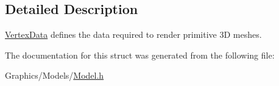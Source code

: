 \subsection{Detailed Description}
\hyperlink{structVertexData}{Vertex\+Data} defines the data required to render primitive 3D meshes. 

The documentation for this struct was generated from the following file\+:\begin{DoxyCompactItemize}
\item 
Graphics/\+Models/\hyperlink{Model_8h}{Model.\+h}\end{DoxyCompactItemize}
